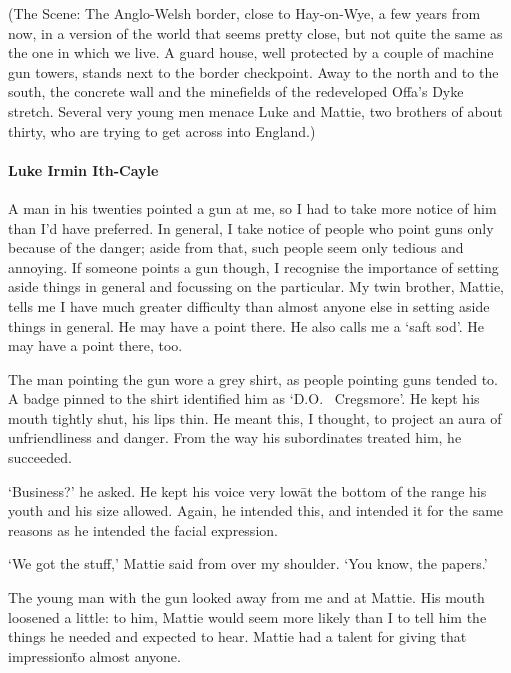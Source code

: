 
(The Scene: The Anglo-Welsh border, close to Hay-on-Wye, a few years
from now, in a version of the world that seems pretty close, but not
quite the same as the one in which we live.  A guard house, well
protected by a couple of machine gun towers, stands next to the border
checkpoint.  Away to the north and to the south, the concrete wall and
the minefields of the redeveloped Offa’s Dyke stretch.  Several very
young men menace Luke and Mattie, two brothers of about thirty, who
are trying to get across into England.)

\prelude

\paragraph{Luke Irmin Ith-Cayle}\strut

A man in his twenties pointed a gun at me, so I had to take more
notice of him than I’d have preferred.  In general, I take notice of
people who point guns only because of the danger; aside from that,
such people seem only tedious and annoying.  If someone points a gun
though, I recognise the importance of setting aside things in general
and focussing on the particular.  My twin brother, Mattie, tells me I
have much greater difficulty than almost anyone else in setting aside
things in general.  He may have a point there.  He also calls me a
‘saft sod’.  He may have a point there, too.

The man pointing the gun wore a grey shirt, as people pointing guns
tended to.  A badge pinned to the shirt identified him as ‘D.O.~%
Cregsmore’.  He kept his mouth tightly shut, his lips thin.  He meant
this, I thought, to project an aura of unfriendliness and danger.
From the way his subordinates treated him, he succeeded.

‘Business?’ he asked.  He kept his voice very low\=at the bottom of
the range his youth and his size allowed.  Again, he intended this,
and intended it for the same reasons as he intended the facial
expression.

‘We got the stuff,’ Mattie said from over my shoulder.  ‘You know, the
papers.’

The young man with the gun looked away from me and at Mattie.  His
mouth loosened a little: to him, Mattie would seem more likely than I
to tell him the things he needed and expected to hear.  Mattie had a
talent for giving that impression\=to almost anyone.

